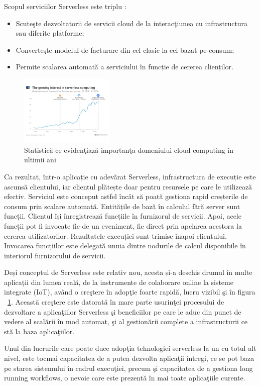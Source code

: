 Scopul serviciilor Serverless este triplu : 
\begin{itemize}
\item Scuteşte dezvoltatorii de servicii cloud de la interacţiunea cu infrastructura sau diferite platforme;
\item Converteşte modelul de facturare din cel clasic la cel bazat pe consum;
\item Permite scalarea automată a serviciului în funcție de cererea clienților.
\end{itemize}
\par

\begin{figure}
	  \begin{center}
        \includegraphics[width=0.4\textwidth]{images/grafic_serverless_computing}
       \caption{Statistică ce evidenţiază importanţa domeniului cloud computing în ultimii ani}
			\label{fig:cloud_computing_graph}
    \end{center}
\end{figure}
Ca rezultat, într-o aplicație cu adevărat Serverless, infrastructura de execuție este ascunsă clientului, iar clientul plătește doar pentru resursele pe care le utilizează efectiv. Serviciul este conceput astfel încât să poată gestiona rapid creșterile de consum prin scalare automată. Entitățile de bază în calculul fără server sunt funcții. Clientul își înregistrează funcțiile în furnizorul de servicii. Apoi, acele funcții pot fi invocate fie de un eveniment, fie direct prin apelarea acestora la cererea utilizatorilor. Rezultatele execuției sunt trimise înapoi clientului. Invocarea funcțiilor este delegată unuia dintre nodurile de calcul disponibile în interiorul furnizorului de servicii.

\par
Deși conceptul de Serverless este relativ nou, acesta și-a deschis drumul în multe aplicații din lumea reală, de la instrumente de colaborare online la sisteme integrate (IoT), având o creştere în adopţie foarte rapidă, lucru vizibil şi în figura ~\ref{fig:cloud_computing_graph}. Această creştere este datorată în mare parte usurinţei procesului de dezvoltare a aplicaţiilor Serverless şi beneficiilor pe care le aduc din punct de vedere al scalării în mod automat, şi al gestionării complete a infrastructurii ce stă la baza aplicaţiilor. 
\par
Unul din lucrurile care poate duce adopţia tehnologiei serverless la un cu totul alt nivel, este tocmai capacitatea de a putea dezvolta aplicaţii întregi, ce se pot baza pe starea sistemului în cadrul execuţiei, precum şi capacitatea de a gestiona long running workflows, o nevoie care este prezentă în mai toate aplicaţiile curente. 
